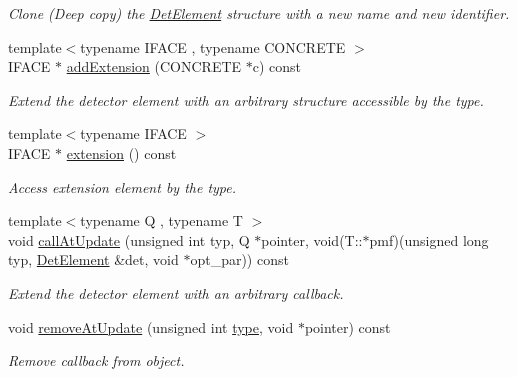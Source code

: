 \begin{DoxyCompactItemize}
\begin{DoxyCompactList}\small\item\em Clone (Deep copy) the \hyperlink{class_d_d4hep_1_1_geometry_1_1_det_element}{Det\+Element} structure with a new name and new identifier. \end{DoxyCompactList}\item 
{\footnotesize template$<$typename I\+F\+A\+CE , typename C\+O\+N\+C\+R\+E\+TE $>$ }\\I\+F\+A\+CE $\ast$ \hyperlink{class_d_d4hep_1_1_geometry_1_1_det_element_af32ca005c26f16b05816966be15a6638}{add\+Extension} (C\+O\+N\+C\+R\+E\+TE $\ast$c) const
\begin{DoxyCompactList}\small\item\em Extend the detector element with an arbitrary structure accessible by the type. \end{DoxyCompactList}\item 
{\footnotesize template$<$typename I\+F\+A\+CE $>$ }\\I\+F\+A\+CE $\ast$ \hyperlink{class_d_d4hep_1_1_geometry_1_1_det_element_a430cc85635e2eff2ff91239f0a405590}{extension} () const
\begin{DoxyCompactList}\small\item\em Access extension element by the type. \end{DoxyCompactList}\item 
{\footnotesize template$<$typename Q , typename T $>$ }\\void \hyperlink{class_d_d4hep_1_1_geometry_1_1_det_element_ad54eb9f407346f0a5fdc84713df1e218}{call\+At\+Update} (unsigned int typ, Q $\ast$pointer, void(T\+::$\ast$pmf)(unsigned long typ, \hyperlink{class_d_d4hep_1_1_geometry_1_1_det_element}{Det\+Element} \&det, void $\ast$opt\+\_\+par)) const
\begin{DoxyCompactList}\small\item\em Extend the detector element with an arbitrary callback. \end{DoxyCompactList}\item 
void \hyperlink{class_d_d4hep_1_1_geometry_1_1_det_element_a7faf425a1cc0a3d7e7029fbee97f6499}{remove\+At\+Update} (unsigned int \hyperlink{class_d_d4hep_1_1_geometry_1_1_det_element_a47782470bbe890c880a2824de6d1b547}{type}, void $\ast$pointer) const
\begin{DoxyCompactList}\small\item\em Remove callback from object. \end{DoxyCompactList}\item 

\end{DoxyCompactItemize}
